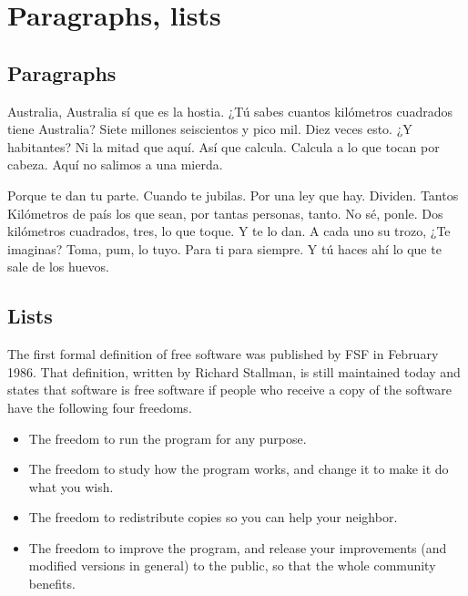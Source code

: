 

\section{Paragraphs, lists}

\subsection{Paragraphs}

Australia, Australia sí que es la hostia. ¿Tú sabes cuantos kilómetros cuadrados tiene Australia? Siete millones seiscientos y pico mil. Diez veces esto. ¿Y habitantes? Ni la mitad que aquí. Así que calcula. Calcula a lo que tocan por cabeza. Aquí no salimos a una mierda.

Porque te dan tu parte. Cuando te jubilas. Por una ley que hay. Dividen. Tantos Kilómetros de país los que sean, por tantas personas, tanto. No sé, ponle. Dos kilómetros cuadrados, tres, lo que toque. Y te lo dan. A cada uno su trozo, ¿Te imaginas? Toma, pum, lo tuyo. Para ti para siempre. Y tú haces ahí lo que te sale de los huevos.

\subsection{Lists}

The first formal definition of free software was published by FSF in February 1986. That definition, written by Richard Stallman, is still maintained today and states that software is free software if people who receive a copy of the software have the following four freedoms.

\begin{itemize}
  \item The freedom to run the program for any purpose.
  \item The freedom to study how the program works, and change it to make it do what you wish.
  \item The freedom to redistribute copies so you can help your neighbor.
  \item The freedom to improve the program, and release your improvements (and modified versions in general) to the public, so that the whole community benefits.
\end{itemize}

